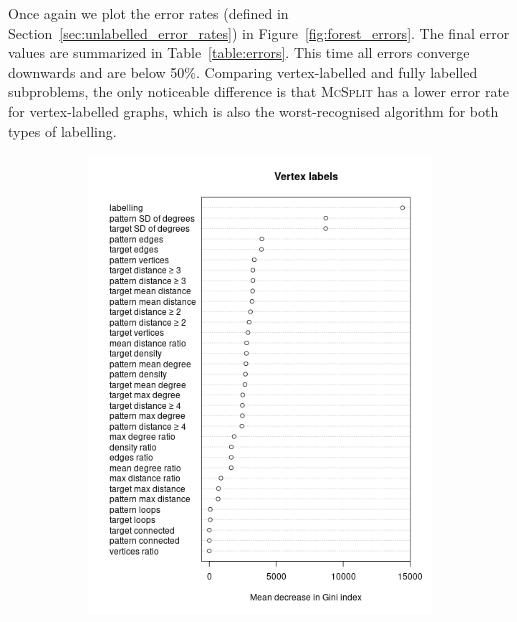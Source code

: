 \documentclass{l4proj}
\theoremstyle{definition}
\theoremstyle{remark}
\begin{document}
Once again we plot the error rates (defined in
Section~\ref{sec:unlabelled_error_rates}) in Figure~\ref{fig:forest_errors}. The
final error values are summarized in Table~\ref{table:errors}. This time all
errors converge downwards and are below 50\%. Comparing vertex-labelled and
fully labelled subproblems, the only noticeable difference is that
\textsc{McSplit} has a lower error rate for vertex-labelled graphs, which is
also the worst-recognised algorithm for both types of labelling.

\begin{figure}
  \centering
  \begin{subfigure}[t]{0.49\textwidth}
    \centering
    \includegraphics[width=\textwidth]{images/vertex_labels_variable_importance.png}
  \end{subfigure}
  \begin{subfigure}[t]{0.49\textwidth}
    \centering

\end{subfigure}
\end{figure}
\end{document}
